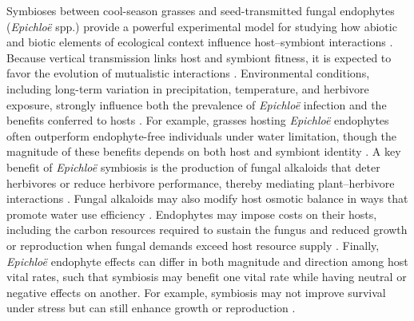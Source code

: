 \documentclass[12pt]{article}\usepackage[]{graphicx}\usepackage[dvipsnames]{xcolor}
\begin{document}
Symbioses between cool-season grasses and seed-transmitted fungal endophytes (\textit{Epichloë} spp.) provide a powerful experimental model for studying how abiotic and biotic elements of ecological context influence host–symbiont interactions \citep{schardl2004symbioses,saikkonen2010defensive,oberhofer2014effects,clay2005herbivores}. 
Because vertical transmission links host and symbiont fitness, it is expected to favor the evolution of mutualistic interactions \citep{gundel2024temporal,gundel2011incorporating}. 
Environmental conditions, including long-term variation in precipitation, temperature, and herbivore exposure, strongly influence both the prevalence of \textit{Epichloë} infection and the benefits conferred to hosts \citep{clay2005herbivores,rudgers2016long,fowler2025increasing}. 
For example, grasses hosting \textit{Epichloë} endophytes often outperform endophyte-free individuals under water limitation, though the magnitude of these benefits depends on both host and symbiont identity \citep{decunta2021systematic}. 
A key benefit of \textit{Epichloë} symbiosis is the production of fungal alkaloids that deter herbivores or reduce herbivore performance, thereby mediating plant–herbivore interactions \citep{saikkonen2010defensive,crawford2010fungal}.
Fungal alkaloids may also modify host osmotic balance in ways that promote water use efficiency \citep{decunta2021systematic}. 
Endophytes may impose costs on their hosts, including the carbon resources required to sustain the fungus and reduced growth or reproduction when fungal demands exceed host resource supply \citep{bennett2022costs}. 
Finally, \textit{Epichloë} endophyte effects can differ in both magnitude and direction among host vital rates, such that symbiosis may benefit one vital rate while having neutral or negative effects on another. 
For example, symbiosis may not improve survival under stress but can still enhance growth or reproduction \citep{yule2013costs,rudgers2012there}.
 
\end{document}
